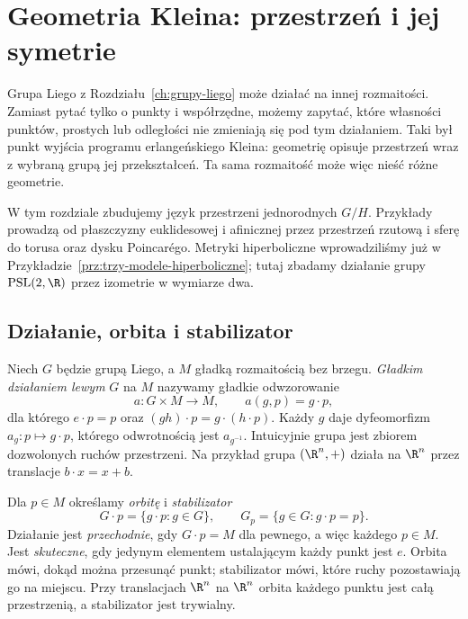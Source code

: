 \chapter{Geometria Kleina: przestrzeń i jej symetrie}
\label{ch:geometria-kleina}

Grupa Liego z Rozdziału~\ref{ch:grupy-liego} może działać na innej
rozmaitości. Zamiast pytać tylko o punkty i współrzędne, możemy
zapytać, które własności punktów, prostych lub odległości nie zmieniają
się pod tym działaniem. Taki był punkt wyjścia programu erlangeńskiego
Kleina: geometrię opisuje przestrzeń wraz z wybraną grupą jej
przekształceń. Ta sama rozmaitość może więc nieść różne geometrie.

W tym rozdziale zbudujemy język przestrzeni jednorodnych $G/H$.
Przykłady prowadzą od płaszczyzny euklidesowej i afinicznej przez
przestrzeń rzutową i sferę do torusa oraz dysku Poincarégo. Metryki
hiperboliczne wprowadziliśmy już w
Przykładzie~\ref{prz:trzy-modele-hiperboliczne}; tutaj zbadamy działanie
grupy $\mathrm{PSL}(2,\R)$ przez izometrie w wymiarze dwa.

\section{Działanie, orbita i stabilizator}
\label{sec:klein-dzialanie}

\begin{definicja}
\label{def:klein-dzialanie}
Niech $G$ będzie grupą Liego, a $M$ gładką rozmaitością bez brzegu.
\emph{Gładkim działaniem lewym} $G$ na $M$ nazywamy gładkie
odwzorowanie
\[
 a:G\times M\longrightarrow M,\qquad a(g,p)=g\cdot p,
\]
dla którego $e\cdot p=p$ oraz $(gh)\cdot p=g\cdot(h\cdot p)$.
Każdy $g$ daje dyfeomorfizm $a_g:p\mapsto g\cdot p$, którego
odwrotnością jest $a_{g^{-1}}$. Intuicyjnie grupa jest zbiorem
dozwolonych ruchów przestrzeni. Na przykład grupa $(\R^n,+)$ działa
na $\R^n$ przez translacje $b\cdot x=x+b$.
\end{definicja}

\begin{definicja}
\label{def:klein-orbita}
Dla $p\in M$ określamy \emph{orbitę} i \emph{stabilizator}
\[
 G\cdot p=\{g\cdot p:g\in G\},\qquad
 G_p=\{g\in G:g\cdot p=p\}.
\]
Działanie jest \emph{przechodnie}, gdy $G\cdot p=M$ dla pewnego,
a więc każdego $p\in M$. Jest \emph{skuteczne}, gdy jedynym elementem
ustalającym każdy punkt jest $e$. Orbita mówi, dokąd można przesunąć
punkt; stabilizator mówi, które ruchy pozostawiają go na miejscu.
Przy translacjach $\R^n$ na $\R^n$ orbita każdego punktu jest całą
przestrzenią, a stabilizator jest trywialny.
\end{definicja}

